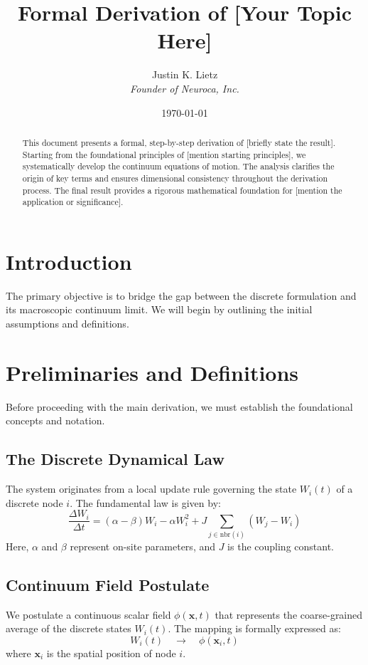 \documentclass[11pt, letterpaper]{article}
\title{Formal Derivation of [Your Topic Here]}
\author{Justin K. Lietz \\[0.2em] \textit{Founder of Neuroca, Inc.}}
\date{\today} %
\begin{document}
\maketitle

\begin{abstract}
    This document presents a formal, step-by-step derivation of [briefly state the result]. Starting from the foundational principles of [mention starting principles], we systematically develop the continuum equations of motion. The analysis clarifies the origin of key terms and ensures dimensional consistency throughout the derivation process. The final result provides a rigorous mathematical foundation for [mention the application or significance].
    \vspace{1cm} %
\end{abstract}



\section{Introduction}
\lipsum[1] %
The primary objective is to bridge the gap between the discrete formulation and its macroscopic continuum limit. We will begin by outlining the initial assumptions and definitions.

\section{Preliminaries and Definitions}
Before proceeding with the main derivation, we must establish the foundational concepts and notation.

\subsection{The Discrete Dynamical Law}
The system originates from a local update rule governing the state $W_i(t)$ of a discrete node $i$. The fundamental law is given by:
\begin{equation}
    \frac{\Delta W_i}{\Delta t} = (\alpha - \beta)W_i - \alpha W_i^2 + J \sum_{j\in \mathrm{nbr}(i)} (W_j - W_i)
    \label{eq:discrete_law}
\end{equation}
Here, $\alpha$ and $\beta$ represent on-site parameters, and $J$ is the coupling constant.

\subsection{Continuum Field Postulate}
We postulate a continuous scalar field $\phi(\mathbf{x}, t)$ that represents the coarse-grained average of the discrete states $W_i(t)$. The mapping is formally expressed as:
$$
    W_i(t) \quad \to \quad \phi(\mathbf{x}_i, t)
$$
where $\mathbf{x}_i$ is the spatial position of node $i$.
\end{document}
